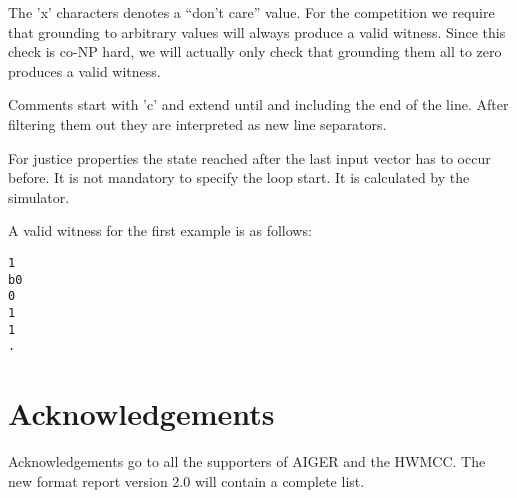 \documentclass{llncs}
\begin{document}
The 'x' characters denotes a ``don't care'' value.  For the competition
we require that grounding to arbitrary values  will
always produce a valid witness.  Since this check is co-NP hard, we
will actually only check that grounding them all to zero produces
a valid witness.

Comments start with 'c' and extend until and including the end of the line.
After filtering them out they are interpreted as new line separators.

For justice properties the state reached after the last input vector
has to occur before.  It is not mandatory to specify the
loop start.  It is calculated by the simulator.

A valid witness for the first example is as follows:
{\small
\begin{verbatim}
1
b0
0
1
1
.
\end{verbatim}}

\section{Acknowledgements}

Acknowledgements go to all the supporters of AIGER and the HWMCC.
The new format report version 2.0 will contain a complete list.
\end{document}
